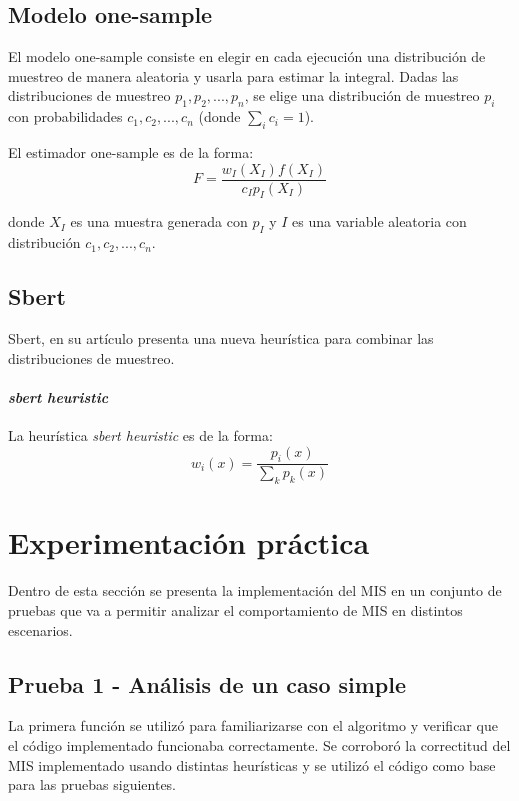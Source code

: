 \documentclass{article}
\begin{document}
\subsection{Modelo one-sample}

El modelo one-sample consiste en elegir en cada ejecución una distribución de muestreo de manera aleatoria y usarla para estimar la integral.
Dadas las distribuciones de muestreo $p_{1}, p_{2}, ..., p_{n}$, se elige una distribución de muestreo $p_{i}$ con probabilidades $c_{1}, c_{2}, ..., c_{n}$ (donde $\sum_{i} c_{i} = 1$).

El estimador one-sample es de la forma:
$$F = \frac{w_{I}(X_{I}) f(X_{I})}{c_{I} p_{I}(X_{I})}$$

donde $X_{I}$ es una muestra generada con $p_{I}$ y $I$ es una variable aleatoria con distribución $c_{1}, c_{2}, ..., c_{n}$.

\subsection{Sbert}

Sbert, en su artículo \cite{Sbert2016} presenta una nueva heurística para combinar las distribuciones de muestreo.

\paragraph{\textit{sbert heuristic}} La heurística \textit{sbert heuristic} es de la forma:
$$ w_{i}(x) = \frac{p_{i}(x)}{\sum_{k} p_{k}(x)}$$

\section{Experimentación práctica}

Dentro de esta sección se presenta la implementación del MIS en un conjunto de pruebas que va a permitir analizar el comportamiento de MIS en distintos escenarios.

\subsection{Prueba 1 - Análisis de un caso simple}

La primera función se utilizó para familiarizarse con el algoritmo y verificar que el código implementado funcionaba correctamente.
Se corroboró la correctitud del MIS implementado usando distintas heurísticas y se utilizó el código como base para las pruebas siguientes.
\end{document}
